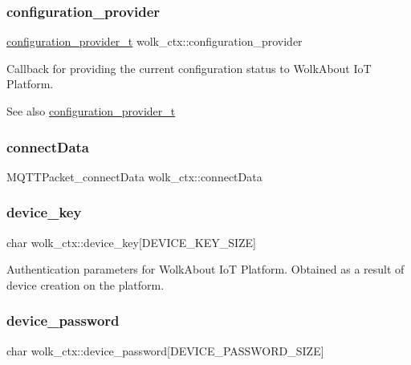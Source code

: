 \subsubsection{\texorpdfstring{configuration\+\_\+provider}{configuration\_provider}}
{\footnotesize\ttfamily \hyperlink{wolk__connector_8h_a64d56254d09f9e452751f32b3c5a39d3}{configuration\+\_\+provider\+\_\+t} wolk\+\_\+ctx\+::configuration\+\_\+provider}

Callback for providing the current configuration status to Wolk\+About IoT Platform. \begin{DoxySeeAlso}{See also}
\hyperlink{wolk__connector_8h_a64d56254d09f9e452751f32b3c5a39d3}{configuration\+\_\+provider\+\_\+t} 
\end{DoxySeeAlso}
\mbox{\label{structwolk__ctx_af63fca32333cbb2d7e2b887eff0b2461}} 
\subsubsection{\texorpdfstring{connect\+Data}{connectData}}
{\footnotesize\ttfamily M\+Q\+T\+T\+Packet\+\_\+connect\+Data wolk\+\_\+ctx\+::connect\+Data}

\mbox{\label{structwolk__ctx_a4b67ae9b0271566e7dae56c03053906b}} 
\subsubsection{\texorpdfstring{device\+\_\+key}{device\_key}}
{\footnotesize\ttfamily char wolk\+\_\+ctx\+::device\+\_\+key\mbox{[}D\+E\+V\+I\+C\+E\+\_\+\+K\+E\+Y\+\_\+\+S\+I\+ZE\mbox{]}}

Authentication parameters for Wolk\+About IoT Platform. Obtained as a result of device creation on the platform. \mbox{\label{structwolk__ctx_af6ea97768cfd0445f8b9535e0e2c354b}} 
\subsubsection{\texorpdfstring{device\+\_\+password}{device\_password}}
{\footnotesize\ttfamily char wolk\+\_\+ctx\+::device\+\_\+password\mbox{[}D\+E\+V\+I\+C\+E\+\_\+\+P\+A\+S\+S\+W\+O\+R\+D\+\_\+\+S\+I\+ZE\mbox{]}}

